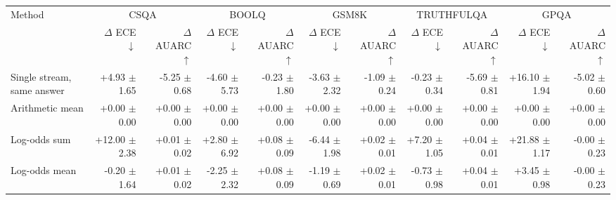 \begin{tabular}{lrrrrrrrrrr}
\toprule
Method & \multicolumn{2}{c}{CSQA} & \multicolumn{2}{c}{BOOLQ} & \multicolumn{2}{c}{GSM8K} & \multicolumn{2}{c}{TRUTHFULQA} & \multicolumn{2}{c}{GPQA} \\
 & $\Delta$ ECE $\downarrow$ & $\Delta$ AUARC $\uparrow$ & $\Delta$ ECE $\downarrow$ & $\Delta$ AUARC $\uparrow$ & $\Delta$ ECE $\downarrow$ & $\Delta$ AUARC $\uparrow$ & $\Delta$ ECE $\downarrow$ & $\Delta$ AUARC $\uparrow$ & $\Delta$ ECE $\downarrow$ & $\Delta$ AUARC $\uparrow$ \\
\midrule
Single stream, same answer & +4.93 {\scriptsize $\pm$ 1.65} & -5.25 {\scriptsize $\pm$ 0.68} & -4.60 {\scriptsize $\pm$ 5.73} & -0.23 {\scriptsize $\pm$ 1.80} & -3.63 {\scriptsize $\pm$ 2.32} & -1.09 {\scriptsize $\pm$ 0.24} & -0.23 {\scriptsize $\pm$ 0.34} & -5.69 {\scriptsize $\pm$ 0.81} & +16.10 {\scriptsize $\pm$ 1.94} & -5.02 {\scriptsize $\pm$ 0.60} \\
Arithmetic mean & +0.00 {\scriptsize $\pm$ 0.00} & +0.00 {\scriptsize $\pm$ 0.00} & +0.00 {\scriptsize $\pm$ 0.00} & +0.00 {\scriptsize $\pm$ 0.00} & +0.00 {\scriptsize $\pm$ 0.00} & +0.00 {\scriptsize $\pm$ 0.00} & +0.00 {\scriptsize $\pm$ 0.00} & +0.00 {\scriptsize $\pm$ 0.00} & +0.00 {\scriptsize $\pm$ 0.00} & +0.00 {\scriptsize $\pm$ 0.00} \\
Log-odds sum & +12.00 {\scriptsize $\pm$ 2.38} & +0.01 {\scriptsize $\pm$ 0.02} & +2.80 {\scriptsize $\pm$ 6.92} & +0.08 {\scriptsize $\pm$ 0.09} & -6.44 {\scriptsize $\pm$ 1.98} & +0.02 {\scriptsize $\pm$ 0.01} & +7.20 {\scriptsize $\pm$ 1.05} & +0.04 {\scriptsize $\pm$ 0.01} & +21.88 {\scriptsize $\pm$ 1.17} & -0.00 {\scriptsize $\pm$ 0.23} \\
Log-odds mean & -0.20 {\scriptsize $\pm$ 1.64} & +0.01 {\scriptsize $\pm$ 0.02} & -2.25 {\scriptsize $\pm$ 2.32} & +0.08 {\scriptsize $\pm$ 0.09} & -1.19 {\scriptsize $\pm$ 0.69} & +0.02 {\scriptsize $\pm$ 0.01} & -0.73 {\scriptsize $\pm$ 0.98} & +0.04 {\scriptsize $\pm$ 0.01} & +3.45 {\scriptsize $\pm$ 0.98} & -0.00 {\scriptsize $\pm$ 0.23} \\

\end{tabular}
